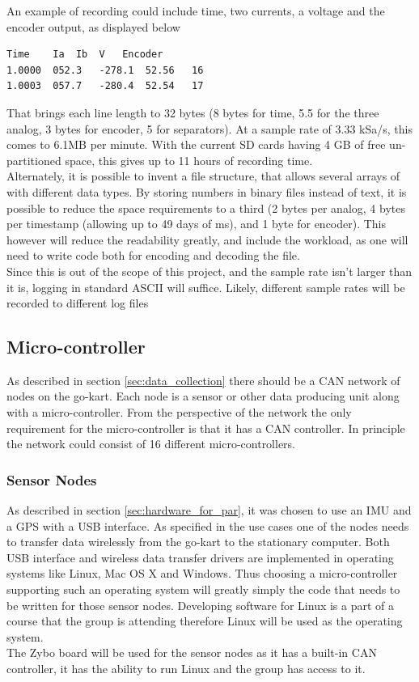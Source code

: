 An example of recording could include time, two currents, a voltage and the encoder output, as displayed below
\begin{lstlisting}
Time	Ia	Ib	V	Encoder
1.0000	052.3	-278.1	52.56	16
1.0003	057.7	-280.4	52.54	17
\end{lstlisting}
That brings each line length to 32 bytes (8 bytes for time, 5.5 for the three analog, 3 bytes for encoder, 5 for separators).
At a sample rate of 3.33 kSa/s, this comes to 6.1MB per minute. 
With the current SD cards having 4 GB of free un-partitioned space, this gives up to 11 hours of recording time.\\

Alternately, it is possible to invent a file structure, that allows several arrays of with different data types.
By storing numbers in binary files instead of text, it is possible to reduce the space requirements to a third (2 bytes per analog, 4 bytes per timestamp (allowing up to 49 days of ms), and 1 byte for encoder).
This however will reduce the readability greatly, and include the workload, as one will need to write code both for encoding and decoding the file. \\

Since this is out of the scope of this project, and the sample rate isn't larger than it is, logging in standard ASCII will suffice.
Likely, different sample rates will be recorded to different log files












\subsection{Micro-controller}
As described in section \ref{sec:data_collection} there should be a CAN network of nodes on the go-kart.
Each node is a sensor or other data producing unit along with a micro-controller.
From the perspective of the network the only requirement for the micro-controller is that it has a CAN controller.
In principle the network could consist of 16 different micro-controllers.

\subsubsection*{Sensor Nodes}
As described in section \ref{sec:hardware_for_par}, it was chosen to use an IMU and a GPS with a USB interface. 
As specified in the use cases one of the nodes needs to transfer data wirelessly from the go-kart to the stationary computer. 
Both USB interface and wireless data transfer drivers are implemented in operating systems like Linux, Mac OS X and Windows.
Thus choosing a micro-controller supporting such an operating system will greatly simply the code that needs to be written for those sensor nodes.
Developing software for Linux is a part of a course that the group is attending therefore Linux will be used as the operating system.
\\
The Zybo board will be used for the sensor nodes as it has a built-in CAN controller, it has the ability to run Linux and the group has access to it.

